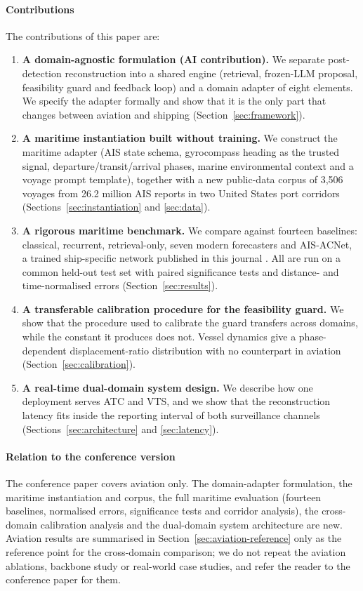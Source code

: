 \paragraph{Contributions} The contributions of this paper are:
\begin{enumerate}
\item \textbf{A domain-agnostic formulation (AI contribution).} We separate
post-detection reconstruction into a shared engine (retrieval, frozen-LLM
proposal, feasibility guard and feedback loop) and a domain adapter of eight
elements. We specify the adapter formally and show that it is the only part
that changes between aviation and shipping (Section~\ref{sec:framework}).
\item \textbf{A maritime instantiation built without training.} We
construct the maritime adapter (AIS state schema, gyrocompass heading as the
trusted signal, departure/transit/arrival phases, marine environmental
context and a voyage prompt template), together with a new public-data
corpus of 3,506 voyages from 26.2 million AIS reports in two United States
port corridors (Sections~\ref{sec:instantiation} and
\ref{sec:data}).
\item \textbf{A rigorous maritime benchmark.} We compare against fourteen
baselines: classical, recurrent, retrieval-only, seven modern forecasters and
AIS-ACNet, a trained ship-specific network published in this journal
\citep{shin2024aisacnet}. All are run on a common held-out test set with
paired significance tests and distance- and time-normalised errors
(Section~\ref{sec:results}).
\item \textbf{A transferable calibration procedure for the feasibility
guard.} We show that the procedure used to calibrate the guard transfers
across domains, while the constant it produces does not. Vessel dynamics
give a phase-dependent displacement-ratio distribution with no counterpart
in aviation (Section~\ref{sec:calibration}).
\item \textbf{A real-time dual-domain system design.} We describe how one
deployment serves ATC and VTS, and we show that the reconstruction latency
fits inside the reporting interval of both surveillance channels
(Sections~\ref{sec:architecture} and \ref{sec:latency}).
\end{enumerate}

\paragraph{Relation to the conference version} The conference paper
\citep{felendler2026trajrag} covers aviation only. The domain-adapter
formulation, the maritime instantiation and corpus, the full maritime
evaluation (fourteen baselines, normalised errors, significance tests and
corridor analysis), the cross-domain calibration analysis and the
dual-domain system architecture are new. Aviation results are summarised in
Section~\ref{sec:aviation-reference} only as the reference point for the
cross-domain comparison; we do not repeat the aviation ablations, backbone
study or real-world case studies, and refer the reader to the conference
paper for them.

